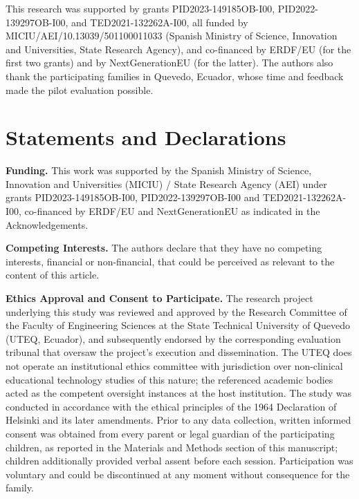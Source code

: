 \documentclass[pdflatex,sn-apa]{sn-jnl}%
\begin{document}

\backmatter

    This research was supported by grants PID2023-149185OB-I00, PID2022-139297OB-I00, and TED2021-132262A-I00, all funded by MICIU/AEI/10.13039/501100011033 (Spanish Ministry of Science, Innovation and Universities, State Research Agency), and co-financed by ERDF/EU (for the first two grants) and by NextGenerationEU (for the latter).
    The authors also thank the participating families in Quevedo, Ecuador, whose time and feedback made the pilot evaluation possible.

\section*{Statements and Declarations}

    \textbf{Funding.}
        This work was supported by the Spanish Ministry of Science, Innovation and Universities (MICIU) / State Research Agency (AEI) under grants PID2023-149185OB-I00, PID2022-139297OB-I00 and TED2021-132262A-I00, co-financed by ERDF/EU and NextGenerationEU as indicated in the Acknowledgements.

    \textbf{Competing Interests.}
        The authors declare that they have no competing interests, financial or non-financial, that could be perceived as relevant to the content of this article.

    \textbf{Ethics Approval and Consent to Participate.}
        The research project underlying this study was reviewed and approved by the Research Committee of the Faculty of Engineering Sciences at the State Technical University of Quevedo (UTEQ, Ecuador), and subsequently endorsed by the corresponding evaluation tribunal that oversaw the project's execution and dissemination. The UTEQ does not operate an institutional ethics committee with jurisdiction over non-clinical educational technology studies of this nature; the referenced academic bodies acted as the competent oversight instances at the host institution. The study was conducted in accordance with the ethical principles of the 1964 Declaration of Helsinki and its later amendments. Prior to any data collection, written informed consent was obtained from every parent or legal guardian of the participating children, as reported in the Materials and Methods section of this manuscript; children additionally provided verbal assent before each session. Participation was voluntary and could be discontinued at any moment without consequence for the family.
\end{document}
